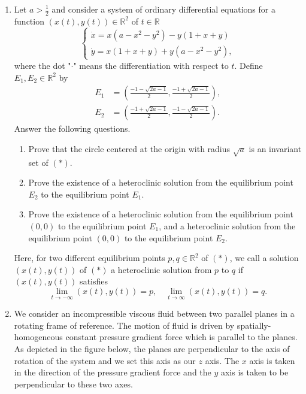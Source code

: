 \documentclass{article}
\begin{document}
\begin{enumerate}[label=\fbox{\arabic*}]
  \item Let $a > \frac{1}{2}$ and consider a system of ordinary differential equations for a function $(x(t), y(t)) \in \mathbb{R}^2$ of $t \in \mathbb{R}$
        \begin{equation*}
          \begin{cases}
            \dot{x} = x(a - x^2 - y^2) - y(1 + x + y) \\
            \dot{y} = x(1 + x + y) + y(a - x^2 - y^2),
          \end{cases} \tag{$*$}
        \end{equation*}
        where the dot "$\cdot$" means the differentiation with respect to $t$. Define $E_1, E_2 \in \mathbb{R}^2$ by
        \begin{align*}
          E_1 &= \left( \frac{-1 - \sqrt{2a - 1}}{2}, \frac{-1 + \sqrt{2a - 1}}{2} \right), \\
          E_2 &= \left( \frac{-1 + \sqrt{2a - 1}}{2}, \frac{-1 - \sqrt{2a - 1}}{2} \right).
        \end{align*}
        Answer the following questions.
        \begin{enumerate}[label=(\arabic*)]
          \item Prove that the circle centered at the origin with radius $\sqrt{a}$ is an invariant set of $(*)$.
          \item Prove the existence of a heteroclinic solution from the equilibrium point $E_2$ to the equilibrium point $E_1$.
          \item Prove the existence of a heteroclinic solution from the equilibrium point $(0, 0)$ to the equilibrium point $E_1$, and a heteroclinic solution from the equilibrium point $(0, 0)$ to the equilibrium point $E_2$.
        \end{enumerate}
        Here, for two different equilibrium points $p, q \in \mathbb{R}^2$ of $(*)$, we call a solution $(x(t), y(t))$ of $(*)$ a heteroclinic solution from $p$ to $q$ if $(x(t), y(t))$ satisfies
        \[
          \lim_{t \to -\infty} (x(t), y(t)) = p, \quad \lim_{t \to \infty} (x(t), y(t)) = q.
        \]

  \item We consider an incompressible viscous fluid between two parallel planes in a rotating frame of reference. The motion of fluid is driven by spatially-homogeneous constant pressure gradient force which is parallel to the planes. As depicted in the figure below, the planes are perpendicular to the axis of rotation of the system and we set this axis as our $z$ axis. The $x$ axis is taken in the direction of the pressure gradient force and the $y$ axis is taken to be perpendicular to these two axes.


\end{enumerate}
\end{document}
